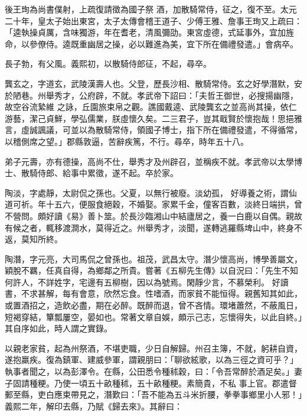 \begin{pinyinscope}
 後王珣為尚書僕射，上疏復請徵為國子祭
 酒，加散騎常侍，征之，復不至。太元二十年，皇太子始出東宮，太子太傳會稽王道子、少傅王雅、詹事王珣又上疏曰：「逵執操貞厲，含味獨游，年在耆老，清風彌劭。東宮虛德，式延事外，宜加旌命，以參僚侍。逵既重幽居之操，必以難進為美，宜下所在備禮發遣。」會病卒。



 長子勃，有父風。義熙初，以散騎侍郎征，不起，尋卒。



 龔玄之，字道玄，武陵漢壽人也。父登，歷長沙相、散騎常侍。玄之好學潛默，安於陋巷。州舉秀才，公府辟，不就。孝武帝下詔曰：「夫哲王御世，必搜揚幽隱，故空谷流縶維
 之詠，丘園旅束帛之觀。譙國戴逵、武陵龔玄之並高尚其操，依仁游藝，潔己貞鮮，學弘儒業，朕虛懷久矣。二三君子，豈其戢賢於懷抱哉！思挹雅言，虛誠諷議，可並以為散騎常侍，領國子博士，指下所在備禮發遣，不得循常，以稽側席之望。」郡縣敦逼，苦辭疾篤，不行。尋卒，時年五十八。



 弟子元壽，亦有德操，高尚不仕，舉秀才及州辟召，並稱疾不就。孝武帝以太學博士、散騎侍郎、給事中累徵，遂不起。卒於家。



 陶淡，字處靜，太尉侃之孫也。父夏，以無行被廢。淡幼孤，
 好導養之術，謂仙道可祈。年十五六，便服食絕穀，不婚娶。家累千金，僮客百數，淡終日端拱，曾不營問。頗好讀《易》善卜筮。於長沙臨湘山中結廬居之，養一白鹿以自偶。親故有候之者，輒移渡澗水，莫得近之。州舉秀才，淡聞，遂轉逃羅縣埤山中，終身不返，莫知所終。



 陶潛，字元亮，大司馬侃之曾孫也。祖茂，武昌太守。潛少懷高尚，博學善屬文，穎脫不羈，任真自得，為鄉鄰之所貴。嘗著《五柳先生傳》以自況曰：「先生不知何許人，不詳姓字，宅邊有五柳樹，因以為號焉。閑靜少言，不慕榮利。
 好讀書，不求甚解，每有會意，欣然忘食。性嗜酒，而家貧不能恒得。親舊知其如此，或置酒招之，造飲必盡，期在必醉。既醉而退，曾不吝情。環堵蕭然，不蔽風日，短褐穿結，簞瓢屢空，晏如也。常著文章自娛，頗示己志，忘懷得失，以此自終。」其自序如此，時人謂之實錄。



 以親老家貧，起為州祭酒，不堪吏職，少日自解歸。州召主簿，不就，躬耕自資，遂抱羸疾。復為鎮軍、建威參軍，謂親朋曰：「聊欲絃歌，以為三徑之資可乎？」執事者聞之，以為彭澤令。在縣，公田悉令種秫穀，曰：「令吾常醉於酒足矣。」妻子固請種粳。乃使一頃五十畝種秫，五十畝種粳。素簡貴，不私
 事上官。郡遣督郵至縣，吏白應束帶見之，潛歎曰：「吾不能為五斗米折腰，拳拳事鄉里小人邪！」義熙二年，解印去縣，乃賦《歸去來》。其辭曰：




\end{pinyinscope}
